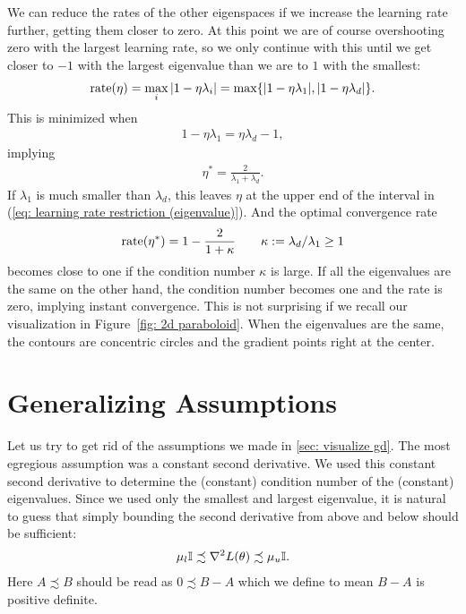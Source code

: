 We can reduce the rates of the other eigenspaces if we
increase the learning rate further, getting them closer to zero. At this point
we are of course overshooting zero with the largest learning rate, so we only
continue with this until we get closer to \(-1\) with the largest eigenvalue
than we are to \(1\) with the smallest:
%
\begin{align*}
	\text{rate}(\eta)=\max_{i} |1-\eta\lambda_i| = \max\{|1-\eta\lambda_1|, |1-\eta\lambda_d|\}.
\end{align*}
%
This is minimized when
%
\begin{align*}
	1-\eta\lambda_1 = \eta\lambda_d -1,
\end{align*}
%
implying
%
\begin{align*}
	\eta^* = \frac{2}{\lambda_1 + \lambda_d}.
\end{align*}
%
If \(\lambda_1\) is much smaller than \(\lambda_d\), this leaves \(\eta\)
at the upper end of the interval in (\ref{eq: learning rate restriction
(eigenvalue)}). And the optimal convergence rate
%
\begin{align*}
	\text{rate}(\eta^*)
	= 1 - \frac{2}{1+\kappa}
	\qquad \kappa:=\lambda_d/\lambda_1 \ge 1
\end{align*}
%
becomes close to one if the condition number \(\kappa\) is large.
If all the eigenvalues are the same on the other hand, the condition number
becomes one and the rate is zero, implying instant convergence. This is not
surprising if we recall our visualization in Figure~\ref{fig: 2d paraboloid}.
When the eigenvalues are the same, the contours are concentric circles and the
gradient points right at the center.


\section{Generalizing Assumptions}

Let us try to get rid of the assumptions we made in \ref{sec: visualize gd}.
The most egregious assumption was a constant second derivative. We used this
constant second derivative to determine the (constant) condition number of
the (constant) eigenvalues. Since we used only the smallest and largest
eigenvalue, it is natural to guess that simply bounding the second derivative
from above and below should be sufficient:
%
\begin{align*}
	\mu_l \mathbb{I} \precsim \nabla^2 L(\theta) \precsim \mu_u \mathbb{I}.
\end{align*}
%
Here \(A \precsim B\) should be read as \(0\precsim B-A\) which we define to mean
\(B-A\) is positive definite.

